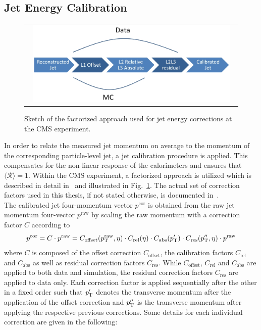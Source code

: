\subsection{Jet Energy Calibration}
\label{subsec:jets_calib} 
\begin{figure}[!t]
  \centering 
  \begin{tabular}{c}
    \includegraphics[width=0.95\textwidth]{figures/JEC.jpg} 
  \end{tabular}
  \caption{Sketch of the factorized approach used for jet energy corrections at the CMS experiment.}
  \label{fig:jec_sketch}
\end{figure}
In order to relate the measured jet momentum on average to the momentum of the corresponding particle-level jet, a jet calibration procedure is applied. This compensates for the non-linear response of the calorimeters and ensures that $\langle \mathcal{R} \rangle = 1$. Within the CMS experiment, a factorized approach is utilized which is described in detail in~\cite{1748-0221-6-11-P11002} and illustrated in Fig.~\ref{fig:jec_sketch}. The actual set of correction factors used in this thesis, if not stated otherwise, is documented in~\cite{CMS-DP-2013-033}. \\
The calibrated jet four-momentum vector $p^\mathrm{cor}$ is obtained from the raw jet momentum four-vector $p^\mathrm{raw}$ by scaling the raw momentum with a correction factor $C$ according to
\begin{equation}
p^\mathrm{cor} = C \cdot p^\mathrm{raw} = C_{\mathrm{offset}}(p_{\text{T}}^\mathrm{raw}, \eta) \cdot C_{\mathrm{rel}}(\eta) \cdot C_{\mathrm{abs}}(p_{\text{T}}') \cdot C_\mathrm{res}(p_{\text{T}}'', \eta) \cdot p^\mathrm{raw}
\end{equation} 
 where $C$ is composed of the offset correction $C_{\mathrm{offset}}$, the calibration factors $C_{\mathrm{rel}}$ and $C_{\mathrm{abs}}$ as well as residual correction factors $C_{\mathrm{res}}$. While $C_{\mathrm{offset}}$, $C_{\mathrm{rel}}$ and $C_{\mathrm{abs}}$ are applied to both data and simulation, the residual correction factors $C_{\mathrm{res}}$ are applied to data only. Each correction factor is applied sequentially after the other in a fixed order such that $p_{\text{T}}'$ denotes the transverse momentum after the application of the offset correction and $p_{\text{T}}''$ is the transverse momentum after applying the respective previous corrections. Some details for each individual correction are given in the following: 

